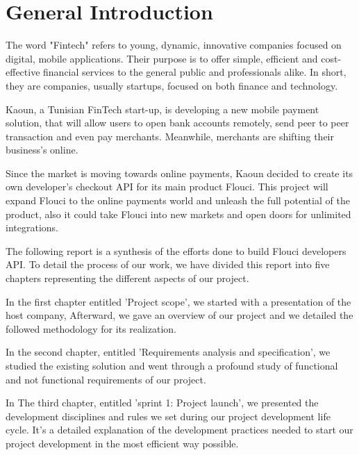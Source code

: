 \chapter*{General Introduction}
\graphicspath{{Introduction/figures/}}
\begin{spacing}{1.1}

The word "Fintech" refers to young, dynamic, innovative companies focused on digital, mobile applications. Their purpose is to offer simple, efficient and cost-effective financial services to the general public and professionals alike. In short, they are companies, usually startups, focused on both finance and technology.\newline

Kaoun, a Tunisian FinTech start-up, is developing a new mobile payment solution, that will allow users to open bank accounts remotely, send peer to peer transaction and even pay merchants.  Meanwhile, merchants are shifting their business's online.  \newline


Since the market is moving towards online payments, Kaoun decided to create its own developer's checkout API for its main product Flouci. This project will expand Flouci to the online payments world and unleash the full potential of the product, also it could take Flouci into new markets and open doors for unlimited integrations.\newline


The following report is a synthesis of the efforts done to build Flouci developers API.
To detail the process of our work, we have divided this report into five chapters representing the different aspects of our project.

In the first chapter entitled 'Project scope', we started with a presentation of the host company, Afterward,  we gave an overview of our project and we detailed the followed methodology for its realization.

In the second chapter, entitled 'Requirements analysis and specification', we studied the existing solution and went through a profound study of functional and not functional requirements of our project.

In The third chapter, entitled 'sprint 1:  Project launch', we presented the development disciplines and rules we set during our project development life cycle. It's a detailed explanation of the development practices needed to start our project development in the most efficient way possible. 


\end{spacing}
